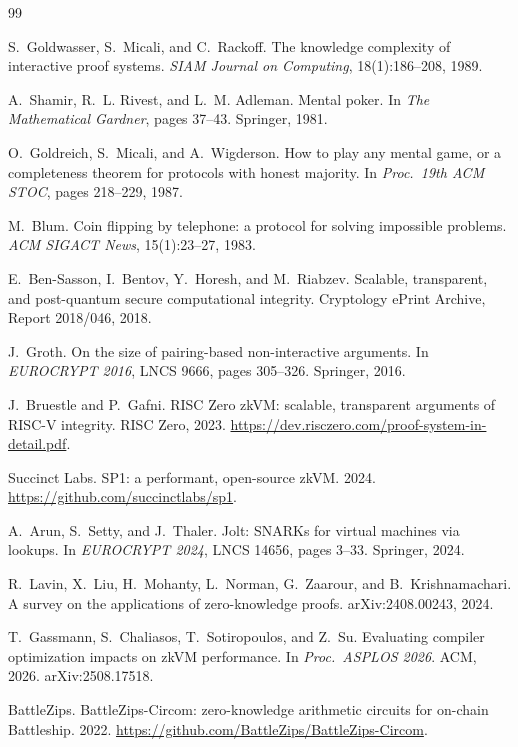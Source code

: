 \documentclass[11pt,a4paper]{article}
\begin{document}
\begin{thebibliography}{99}\small

 S.~Goldwasser, S.~Micali, and C.~Rackoff.
The knowledge complexity of interactive proof systems.
\emph{SIAM Journal on Computing}, 18(1):186--208, 1989.

 A.~Shamir, R.~L. Rivest, and L.~M. Adleman.
Mental poker. In \emph{The Mathematical Gardner}, pages 37--43. Springer, 1981.

 O.~Goldreich, S.~Micali, and A.~Wigderson.
How to play any mental game, or a completeness theorem for protocols with
honest majority. In \emph{Proc.\ 19th ACM STOC}, pages 218--229, 1987.

 M.~Blum.
Coin flipping by telephone: a protocol for solving impossible problems.
\emph{ACM SIGACT News}, 15(1):23--27, 1983.

 E.~Ben-Sasson, I.~Bentov, Y.~Horesh, and M.~Riabzev.
Scalable, transparent, and post-quantum secure computational integrity.
Cryptology ePrint Archive, Report 2018/046, 2018.

 J.~Groth.
On the size of pairing-based non-interactive arguments.
In \emph{EUROCRYPT 2016}, LNCS 9666, pages 305--326. Springer, 2016.

 J.~Bruestle and P.~Gafni.
RISC Zero zkVM: scalable, transparent arguments of RISC-V integrity.
RISC Zero, 2023. \url{https://dev.risczero.com/proof-system-in-detail.pdf}.

 Succinct Labs.
SP1: a performant, open-source zkVM.
2024. \url{https://github.com/succinctlabs/sp1}.

 A.~Arun, S.~Setty, and J.~Thaler.
Jolt: SNARKs for virtual machines via lookups.
In \emph{EUROCRYPT 2024}, LNCS 14656, pages 3--33. Springer, 2024.

 R.~Lavin, X.~Liu, H.~Mohanty, L.~Norman, G.~Zaarour, and
B.~Krishnamachari.
A survey on the applications of zero-knowledge proofs.
arXiv:2408.00243, 2024.

 T.~Gassmann, S.~Chaliasos, T.~Sotiropoulos, and
Z.~Su. Evaluating compiler optimization impacts on zkVM performance.
In \emph{Proc.\ ASPLOS 2026}. ACM, 2026. arXiv:2508.17518.

 BattleZips.
BattleZips-Circom: zero-knowledge arithmetic circuits for on-chain
Battleship. 2022. \url{https://github.com/BattleZips/BattleZips-Circom}.


\end{thebibliography}
\end{document}
